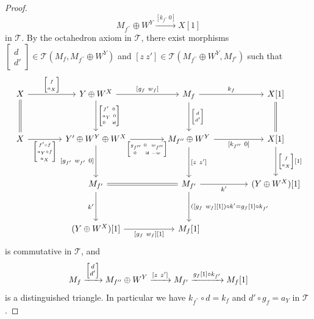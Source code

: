 \documentclass[a4paper,reqno,10pt]{amsart}
\theoremstyle{definition}
\theoremstyle{definition}
\theoremstyle{definition}
\theoremstyle{definition}
\theoremstyle{plain}
\newcommand{\id}{\mathsf{id}}
\newcommand{\CT}{\mathcal{T}}
\begin{document}
\begin{proof}
\[M_{f^{\prime\prime}}\oplus W^Y
\xrightarrow{[k_{f^{\prime\prime}}\ 0]}
X[1]
\]
in $\CT$. By the octahedron axiom in $\CT$, there exist
morphisms $\begin{bmatrix}d\\d'\end{bmatrix}\in\CT(M_f,M_{f^{\prime\prime}}\oplus W^Y)$ and $[z\ z']\in\CT(M_{f^{\prime\prime}}\oplus W^Y,M_{f'})$ such that
\begin{equation}\label{octa_XYWMX}
\begin{tikzcd}[row sep=1.2cm, column sep=1.4cm]
{}
X
\arrow{r}{{\scriptsize\begin{bmatrix}f\\a_X\end{bmatrix}}}
\arrow[equal]{d}{}
&Y\oplus W^X
\arrow{r}{[g_f\ w_f]}
\arrow{d}{{\scriptsize\begin{bmatrix}f'\ \,0\\a_Y\ 0\\0\ \ \ \id\end{bmatrix}}} 
&
M_f
\arrow{r}{k_f}
\arrow{d}{{\scriptsize\begin{bmatrix}d\\d'\end{bmatrix}}}
&
X{[}1{]} \arrow[equal]{d}
\\
X
\arrow{r}[swap]{{\scriptsize\begin{bmatrix}f'\circ f\\a_Y\circ f\\ a_X\end{bmatrix}}}
&
Y'\oplus W^Y\oplus W^X 
\arrow{r}[swap]{{\scriptsize\begin{bmatrix}g_{f^{\prime\prime}}\ 0\ \ w_{f^{\prime\prime}}\\ 0\ \ \ \ \id\ -w\end{bmatrix}}}
\arrow{d}[swap]{{[}g_{f'}\ w_{f'}\ 0{]}} 
&M_{f^{\prime\prime}}\oplus W^Y
\arrow{r}[swap]{{[}k_{f^{\prime\prime}}\ 0{]}}
\arrow{d}{[z\ z']}
&X{[}1{]}
\arrow{d}{{\scriptsize\begin{bmatrix}f\\a_X\end{bmatrix}}{[}1{]}}
\\
&M_{f'}
\arrow[equal]{r}
\arrow{d}[swap]{k'}
&M_{f'}
\arrow{r}[swap]{k'}
\arrow{d}{({[}g_f\ w_f{]}{[}1{]})\circ k'=g_f{[}1{]}\circ k_{f'}}
&(Y\oplus W^X){[}1{]}
\\
&(Y\oplus W^X){[}1{]}
\arrow[swap]{r}{{[}g_f\ w_f{]}{[}1{]}}
&M_f{[}1{]}
\end{tikzcd}
\end{equation}
is commutative in $\CT$,
and \begin{equation}\label{dt_MWMM}
M_f\xrightarrow{{\scriptsize\begin{bmatrix}d\\d'\end{bmatrix}}}M_{f^{\prime\prime}}\oplus W^Y\xrightarrow{[z\ z']}M_{f'}\xrightarrow{g_f[1]\circ k_{f'}}M_f[1]
\end{equation}
is a distinguished triangle.
In particular we have $k_{f^{\prime\prime}}\circ d=k_f$ and $d'\circ g_f=a_Y$ in $\CT$.


\end{proof}
\end{document}
